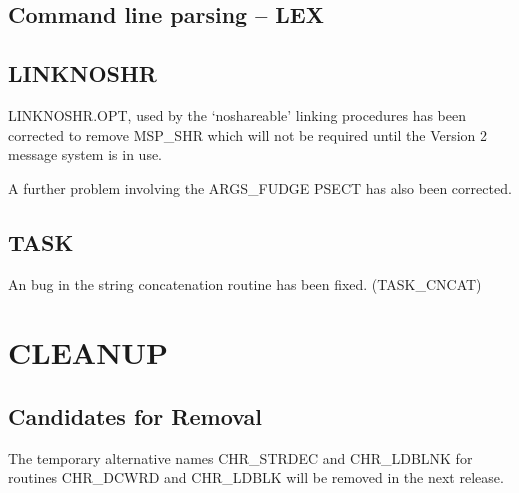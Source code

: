 \subsection{Command line parsing -- LEX}

\subsection{LINKNOSHR}
LINKNOSHR.OPT, used by the `noshareable' linking procedures has been 
corrected to remove MSP\_SHR which will not be required until the Version 2 
message system is in use.

A further problem involving the ARGS\_FUDGE PSECT has also been corrected.

\subsection{TASK}
An bug in the string concatenation routine has been fixed.
(TASK\_CNCAT)

\section{CLEANUP}
\subsection{Candidates for Removal}
The temporary alternative names CHR\_STRDEC and CHR\_LDBLNK for routines 
CHR\_DCWRD and CHR\_LDBLK will be removed in the next release.


